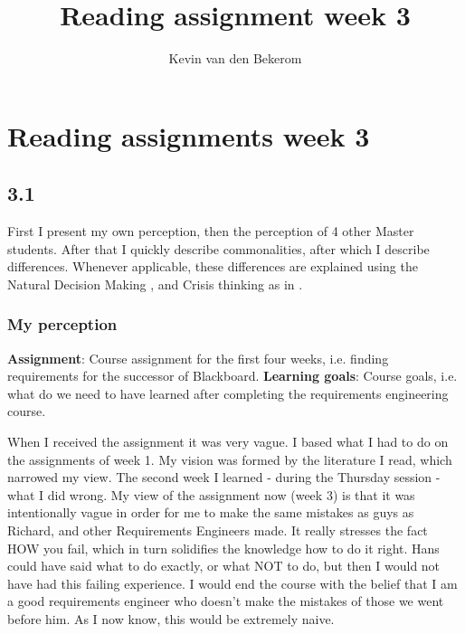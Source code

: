 

\title{Reading assignment week 3}
\newcommand{\TitelAbbr}{}
\newcommand{\Version}{0.1}



\what{}
\supervisors{}
\author{Kevin van den Bekerom}




\maketitle

\clearpage


\chapter*{Reading assignments week 3}

\section*{3.1}
First I present my own perception, then the perception of 4 other Master students. After that I quickly describe commonalities, after which I describe differences. Whenever applicable, these differences are explained using the Natural Decision Making \cite{ndm}, and Crisis thinking as in \cite{crisis}.

\subsection*{My perception}
\textbf{Assignment}: Course assignment for the first four weeks, i.e. finding requirements for the successor of Blackboard.
\textbf{Learning goals}: Course goals, i.e. what do we need to have learned after completing the requirements engineering course.

When I received the assignment it was very vague. I based what I had to do on the assignments of week 1. My vision was formed by the literature I read, which narrowed my view.
The second week I learned - during the Thursday session - what I did wrong. My view of the assignment now (week 3) is that it was intentionally vague in order for me to make
the same mistakes as guys as Richard, and other Requirements Engineers made. It really stresses the fact HOW you fail, which in turn solidifies the knowledge how to do it right.
Hans could have said what to do exactly, or what NOT to do, but then I would not have had this failing experience. I would end the course with the belief that I am a good requirements
engineer who doesn't make the mistakes of those we went before him. As I now know, this would be extremely naive. \\

